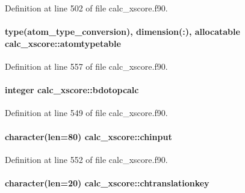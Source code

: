Definition at line 502 of file calc\-\_\-xscore.\-f90.

\hypertarget{classcalc__xscore_afb81db1780584d117536fdfbdc4fef7f}{
\paragraph[{atomtypetable}]{\setlength{\rightskip}{0pt plus 5cm}type({\bf atom\-\_\-type\-\_\-conversion}), dimension(\-:), allocatable calc\-\_\-xscore\-::atomtypetable}}\label{classcalc__xscore_afb81db1780584d117536fdfbdc4fef7f}


Definition at line 557 of file calc\-\_\-xscore.\-f90.

\hypertarget{classcalc__xscore_a85093822797537a637acaa4b645070eb}{
\paragraph[{bdotopcalc}]{\setlength{\rightskip}{0pt plus 5cm}integer calc\-\_\-xscore\-::bdotopcalc}}\label{classcalc__xscore_a85093822797537a637acaa4b645070eb}


Definition at line 549 of file calc\-\_\-xscore.\-f90.

\hypertarget{classcalc__xscore_ae08add3b682f31e7d85dd1d01b756e92}{
\paragraph[{chinput}]{\setlength{\rightskip}{0pt plus 5cm}character(len=80) calc\-\_\-xscore\-::chinput}}\label{classcalc__xscore_ae08add3b682f31e7d85dd1d01b756e92}


Definition at line 552 of file calc\-\_\-xscore.\-f90.

\hypertarget{classcalc__xscore_a7f7e08bee04534a933fe241f21831b27}{
\paragraph[{chtranslationkey}]{\setlength{\rightskip}{0pt plus 5cm}character(len=20) calc\-\_\-xscore\-::chtranslationkey}}\label{classcalc__xscore_a7f7e08bee04534a933fe241f21831b27}


